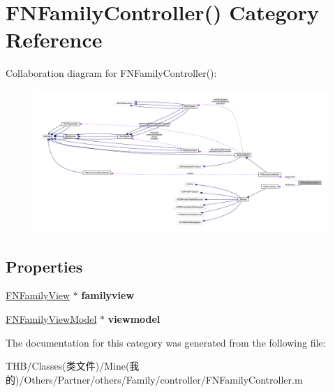 \hypertarget{category_f_n_family_controller_07_08}{}\section{F\+N\+Family\+Controller() Category Reference}
\label{category_f_n_family_controller_07_08}


Collaboration diagram for F\+N\+Family\+Controller()\+:\nopagebreak
\begin{figure}[H]
\begin{center}
\leavevmode
\includegraphics[width=350pt]{category_f_n_family_controller_07_08__coll__graph}
\end{center}
\end{figure}
\subsection*{Properties}
\begin{DoxyCompactItemize}
\item 
\mbox{\label{category_f_n_family_controller_07_08_add74a73f2ae72d8a6ef838e3202e958e}} 
\mbox{\hyperlink{interface_f_n_family_view}{F\+N\+Family\+View}} $\ast$ {\bfseries familyview}
\item 
\mbox{\label{category_f_n_family_controller_07_08_ad6dd9bf2f5d0b0c9b1b26f1f86886ce2}} 
\mbox{\hyperlink{interface_f_n_family_view_model}{F\+N\+Family\+View\+Model}} $\ast$ {\bfseries viewmodel}
\end{DoxyCompactItemize}


The documentation for this category was generated from the following file\+:\begin{DoxyCompactItemize}
\item 
T\+H\+B/\+Classes(类文件)/\+Mine(我的)/\+Others/\+Partner/others/\+Family/controller/F\+N\+Family\+Controller.\+m\end{DoxyCompactItemize}
